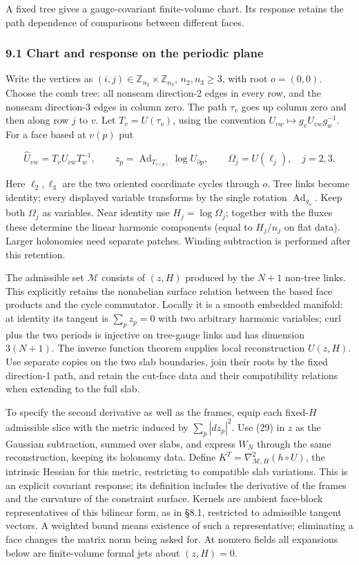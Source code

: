 \documentclass[11pt,a4paper]{article}
\begin{document}
A fixed tree gives a gauge-covariant finite-volume chart. Its response
retains the path dependence of comparisons between different faces.

\hypertarget{chart-and-response-on-the-periodic-plane}{%
\subsubsection{9.1 Chart and response on the periodic
plane}\label{chart-and-response-on-the-periodic-plane}}

Write the vertices as \((i,j)\in\mathbb Z_{n_2}\times\mathbb Z_{n_3}\),
\(n_2,n_3\ge3\), with root \(o=(0,0)\). Choose the comb tree: all
nonseam direction-2 edges in every row, and the nonseam direction-3
edges in column zero. The path \(\tau_v\) goes up column zero and then
along row \(j\) to \(v\). Let \(T_v=U(\tau_v)\), using the convention
\(U_{vw}\mapsto g_vU_{vw}g_w^{-1}\). For a face based at \(v(p)\) put

\[\widehat U_{vw}=T_vU_{vw}T_w^{-1},\qquad
z_p=\operatorname{Ad}_{T_{v(p)}}\log U_{\partial p},\qquad
\Omega_j=U(\ell_j),\quad j=2,3.\tag{33}\]

Here \(\ell_2,\ell_3\) are the two oriented coordinate cycles through
\(o\). Tree links become identity; every displayed variable transforms
by the single rotation \(\operatorname{Ad}_{g_o}\). Keep both
\(\Omega_j\) as variables. Near identity use \(H_j=\log\Omega_j\);
together with the fluxes these determine the linear harmonic components
(equal to \(H_j/n_j\) on flat data). Larger holonomies need separate
patches. Winding subtraction is performed after this retention.

The admissible set \(\mathcal M\) consists of \((z,H)\) produced by the
\(N+1\) non-tree links. This explicitly retains the nonabelian surface
relation between the based face products and the cycle commutator.
Locally it is a smooth embedded manifold: at identity its tangent is
\(\sum_p z_p=0\) with two arbitrary harmonic variables; curl plus the
two periods is injective on tree-gauge links and has dimension
\(3(N+1)\). The inverse function theorem supplies local reconstruction
\(U(z,H)\). Use separate copies on the two slab boundaries, join their
roots by the fixed direction-1 path, and retain the cut-face data and
their compatibility relations when extending to the full slab.

To specify the second derivative as well as the frames, equip each
fixed-\(H\) admissible slice with the metric induced by
\(\sum_p|dz_p|^2\). Use (29) in \(z\) as the Gaussian subtraction,
summed over slabs, and express \(W_N\) through the same reconstruction,
keeping its holonomy data. Define
\(K^T=\nabla_{\mathcal M,H}^2(h\circ U)\), the intrinsic Hessian for
this metric, restricting to compatible slab variations. This is an
explicit covariant response; its definition includes the derivative of
the frames and the curvature of the constraint surface. Kernels are
ambient face-block representatives of this bilinear form, as in §8.1,
restricted to admissible tangent vectors. A weighted bound means
existence of such a representative; eliminating a face changes the
matrix norm being asked for. At nonzero fields all expansions below are
finite-volume formal jets about \((z,H)=0\).
\end{document}
